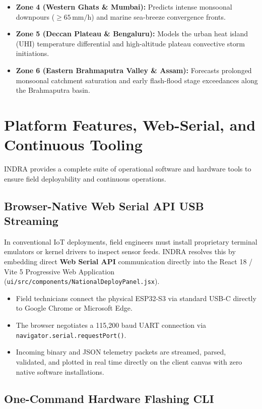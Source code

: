 \documentclass[journal,a4paper]{IEEEtran}
\begin{document}
\begin{itemize}
  \item \textbf{Zone 4 (Western Ghats \& Mumbai):} Predicts intense monsoonal downpours ($\ge 65\,\si{\milli\metre\per\hour}$) and marine sea-breeze convergence fronts.
  \item \textbf{Zone 5 (Deccan Plateau \& Bengaluru):} Models the urban heat island (UHI) temperature differential and high-altitude plateau convective storm initiations.
  \item \textbf{Zone 6 (Eastern Brahmaputra Valley \& Assam):} Forecasts prolonged monsoonal catchment saturation and early flash-flood stage exceedances along the Brahmaputra basin.
\end{itemize}

\section{Platform Features, Web-Serial, and Continuous Tooling}

INDRA provides a complete suite of operational software and hardware tools to ensure field deployability and continuous operations.

\subsection{Browser-Native Web Serial API USB Streaming}

In conventional IoT deployments, field engineers must install proprietary terminal emulators or kernel drivers to inspect sensor feeds. INDRA resolves this by embedding direct \textbf{Web Serial API} communication directly into the React 18 / Vite 5 Progressive Web Application (\nolinkurl{ui/src/components/NationalDeployPanel.jsx}).
\begin{itemize}
  \item Field technicians connect the physical ESP32-S3 via standard USB-C directly to Google Chrome or Microsoft Edge.
  \item The browser negotiates a 115{,}200 baud UART connection via \texttt{navigator.serial.requestPort()}.
  \item Incoming binary and JSON telemetry packets are streamed, parsed, validated, and plotted in real time directly on the client canvas with zero native software installations.
\end{itemize}

\subsection{One-Command Hardware Flashing CLI}
\end{document}
